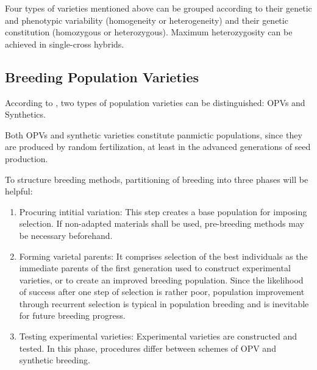 \documentclass[nofonts,]{tufte-handout}
\begin{document}
Four types of varieties mentioned above can be grouped according to
their genetic and phenotypic variability (homogeneity or heterogeneity)
and their genetic constitution (homozygous or heterozygous). Maximum
heterozygosity can be achieved in single-cross hybrids.

\hypertarget{breeding-population-varieties}{%
\subsection{Breeding Population
Varieties}\label{breeding-population-varieties}}

According to \citet{schnell1982synoptic}, two types of population
varieties can be distinguished: OPVs and Synthetics.



Both OPVs and synthetic varieties constitute panmictic populations,
since they are produced by random fertilization, at least in the
advanced generations of seed production.

To structure breeding methods, partitioning of breeding into three
phases will be helpful:

\begin{enumerate}
\def\labelenumi{\arabic{enumi}.}
\item
  Procuring intitial variation: This step creates a base population for
  imposing selection. If non-adapted materials shall be used,
  pre-breeding methods may be necessary beforehand.
\item
  Forming varietal parents: It comprises selection of the best
  individuals as the immediate parents of the first generation used to
  construct experimental varieties, or to create an improved breeding
  population. Since the likelihood of success after one step of
  selection is rather poor, population improvement through recurrent
  selection is typical in population breeding and is inevitable for
  future breeding progress.
\item
  Testing experimental varieties: Experimental varieties are constructed
  and tested. In this phase, procedures differ between schemes of OPV
  and synthetic breeding.
\end{enumerate}
\end{document}
